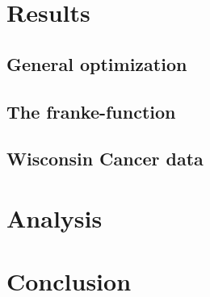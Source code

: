 \documentclass{article}
\begin{document}
\section{Results}

\subsection{General optimization}

\subsection{The franke-function}

\subsection{Wisconsin Cancer data}

\section{Analysis}

\section{Conclusion}


\end{document}
